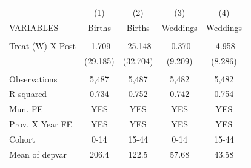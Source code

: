 \begin{tabular}{lcccc} \hline
 & (1) & (2) & (3) & (4) \\
VARIABLES & Births & Births & Weddings & Weddings \\ \hline
 &  &  &  &  \\
Treat (W) X Post & -1.709 & -25.148 & -0.370 & -4.958 \\
 & (29.185) & (32.704) & (9.209) & (8.286) \\
 &  &  &  &  \\
Observations & 5,487 & 5,487 & 5,482 & 5,482 \\
R-squared & 0.734 & 0.752 & 0.742 & 0.754 \\
Mun. FE & YES & YES & YES & YES \\
Prov. X Year FE & YES & YES & YES & YES \\
Cohort & 0-14 & 15-44 & 0-14 & 15-44 \\
 Mean of depvar & 206.4 & 122.5 & 57.68 & 43.58 \\ \hline
\end{tabular}
